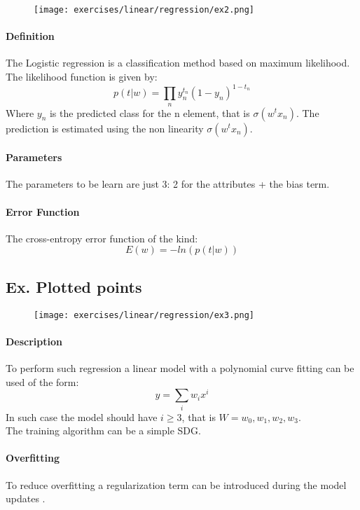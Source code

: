 \begin{figure}[H]
    \centering
    \texttt{[image: exercises/linear/regression/ex2.png]}
\end{figure}
 
 \paragraph{Definition}
The Logistic regression is a classification method based on maximum likelihood.
The likelihood function is given by:
$$p(t|w)=\prod_n y_n^{t_n}(1-y_n)^{1-t_n}$$
Where $y_n$ is the predicted class for the n element, that is $\sigma(w^tx_n)$. The prediction is estimated using the non linearity $\sigma(w^tx_n)$.

\paragraph{Parameters}
The parameters to be learn are just 3: 2 for the attributes + the bias term.

\paragraph{Error Function}
The cross-entropy error function of the kind:
$$E(w)=-ln(p(t|w))$$

\subsection{Ex. Plotted points }

\begin{figure}[H]
    \centering
    \texttt{[image: exercises/linear/regression/ex3.png]}
\end{figure}

\paragraph{Description}
To perform such regression a linear model with a polynomial curve fitting can be used of the form:
$$y=\sum_i w_ix^i$$
In such case the model should have $i \ge 3$, that is $W=w_0,w_1,w_2,w_3$.\\
The training algorithm can be a simple SDG.

\paragraph{Overfitting}
To reduce overfitting a regularization term can be introduced during the model updates .


